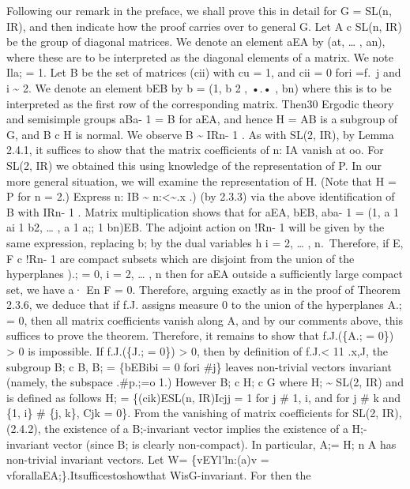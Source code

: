 \documentclass[
]{article}
\theoremstyle{break}
\theoremstyle{plain}
\begin{document}
 Following our remark in the preface, we shall
prove this in detail for G = SL(n, IR), and then indicate how the proof
carries over to general G. Let A c SL(n, IR) be the group of diagonal
matrices. We denote an element aEA by (at, \ldots{} , an), where these
are to be interpreted as the diagonal elements of a matrix. We note Ila;
= 1. Let B be the set of matrices (cii) with cu = 1, and cii = 0 fori
=f.~j and i \textasciitilde{} 2. We denote an element bEB by b = (1, b 2
, •.• , bn) where this is to be interpreted as the first row of the
corresponding matrix. Then30 Ergodic theory and semisimple groups aBa- 1
= B for aEA, and hence H = AB is a subgroup of G, and B c H is normal.
We observe B \textasciitilde{} IRn- 1 . As with SL(2, IR), by Lemma
2.4.1, it suffices to show that the matrix coefficients of n: IA vanish
at oo. For SL(2, IR) we obtained this using knowledge of the
representation of P. In our more general situation, we will examine the
representation of H. (Note that H = P for n = 2.) Express n: IB
\textasciitilde{} n:\textless\textasciitilde.x .) (by 2.3.3) via the
above identification of B with IRn- 1 . Matrix multiplication shows that
for aEA, bEB, aba- 1 = (1, a 1 ai 1 b2, \ldots{} , a 1 a;; 1 bn)EB. The
adjoint action on !Rn- 1 will be given by the same expression, replacing
b; by the dual variables h i = 2, \ldots{} , n.~Therefore, if E, F c
!Rn- 1 are compact subsets which are disjoint from the union of the
hyperplanes ).; = 0, i = 2, \ldots{} , n then for aEA outside a
sufficiently large compact set, we have a· En F = 0. Therefore, arguing
exactly as in the proof of Theorem 2.3.6, we deduce that if f.J. assigns
measure 0 to the union of the hyperplanes A.; = 0, then all matrix
coefficients vanish along A, and by our comments above, this suffices to
prove the theorem. Therefore, it remains to show that f.J.(\{A.; = 0\})
\textgreater{} 0 is impossible. If f.J.(\{J.; = 0\}) \textgreater{} 0,
then by definition of f.J.\textless{} 11 .x,J, the subgroup B; c B, B; =
\{bEBibi = 0 fori \#j\} leaves non-trivial vectors invariant (namely,
the subspace .\#p.;=o 1.) However B; c H; c G where H; \textasciitilde{}
SL(2, IR) and is defined as follows H; = \{(cik)ESL(n, IR)Icjj = 1 for j
\# 1, i, and for j \# k and \{1, i\} \# \{j, k\}, Cjk = 0\}. From the
vanishing of matrix coefficients for SL(2, IR), (2.4.2), the existence
of a B;-invariant vector implies the existence of a H;-invariant vector
(since B; is clearly non-compact). In particular, A;= H; n A has
non-trivial invariant vectors. Let W= \{vEYl'ln:(a)v =
vforallaEA;\}.Itsufficestoshowthat WisG-invariant. For then the
\end{document}

